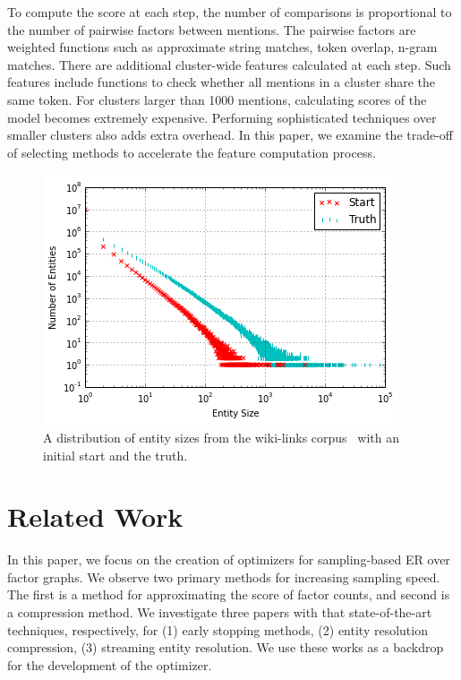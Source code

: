 To compute the score at each step, the number of comparisons is proportional to the number of pairwise factors between mentions.
The pairwise factors are weighted functions such as approximate string matches, token overlap, n-gram matches.
There are additional cluster-wide features calculated at each step.
Such features include functions to check whether all mentions in a cluster share the same token.
For clusters larger than 1000 mentions, calculating scores of the model becomes extremely expensive.
Performing sophisticated techniques over smaller clusters also adds extra overhead.
In this paper, we examine the trade-off of selecting methods to
accelerate the feature computation process.


\begin{figure}
\centering
\includegraphics[width=\columnwidth]{media/start-vs-nd.png}
\caption{A distribution of entity sizes from the wiki-links corpus~\cite{singh12:wiki-links} with an initial start and the truth.}
\label{fig:entity-distribution}
\end{figure}



\section{Related Work}
\label{sec:optimizer:relatedwork}

In this paper, we focus on the creation of optimizers for sampling-based ER over factor graphs.
We observe two primary methods for increasing sampling speed.
The first is a method for approximating the score of factor counts, and second is a compression method.
We investigate three papers with that state-of-the-art techniques, respectively, for
 (1) early stopping methods,
 (2) entity resolution compression,
 (3) streaming entity resolution.
We use these works as a backdrop for the development of the optimizer.

